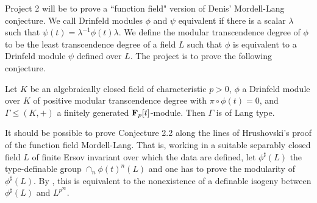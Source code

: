 \vspace{5mm}
\noindent
Project 2 will be to prove a ``function field"
version of Denis' Mordell-Lang conjecture. We
call Drinfeld modules $\phi$ and $\psi$
equivalent if there is a scalar $\lambda$ such
that $\psi(t) = \lambda^{-1}\phi(t)\lambda$.
We define the modular transcendence degree of
$\phi$ to be the least transcendence degree of
a field $L$ such that $\phi$ is equivalent to
a Drinfeld module $\psi$ defined over $L$. The
project is to prove the following conjecture.
\begin{Conjecture} Let $K$ be an algebraically
closed field of characteristic $p>0$, $\phi$ a
Drinfeld module over $K$ of positive
modular transcendence degree with
$\pi\circ\phi(t) = 0$, and $\Gamma \leq (K,+)$
a finitely generated ${\bf F}_{p}[t]$-module.
Then $\Gamma$ is of Lang type.
\end{Conjecture}
It should be possible to prove Conjecture 2.2
along the lines of Hrushovski's proof
\cite{Hrushovski-ML} of the function field
Mordell-Lang. That is, working in a
suitable separably closed field
$L$ of finite Ersov invariant over which the
data are defined, let
$\phi^{\sharp}(L)$ the type-definable group
$\cap_{n}\phi(t)^{n}(L)$ and one has to prove
the modularity of $\phi^{\sharp}(L)$. By
\cite{Bouscaren-Delon}, this is equivalent to
the nonexistence of a definable isogeny
between $\phi^{\sharp}(L)$ and
$L^{p^{\infty}}$.

